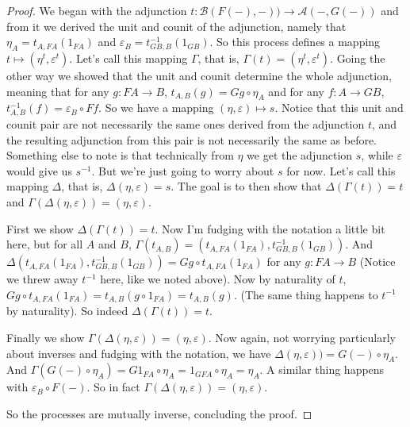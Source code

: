 \documentclass[11pt]{article}
\theoremstyle{definition}
\theoremstyle{definition}
\theoremstyle{plain}
\theoremstyle{plain}
\theoremstyle{plain}
\begin{document}
\begin{proof}
We began with the adjunction $t: \mathscr{B}(F(-),-)) \to \mathscr{A}(-, G(-))$ and from it we derived the unit and counit of the adjunction, namely that $\eta_A=t_{A,FA}(1_{FA})$ and $\varepsilon_B = t^{-1}_{GB, B}(1_{GB})$. So this process defines a mapping $t \mapsto (\eta^t, \varepsilon^t)$. Let's call this mapping $\Gamma$, that is, $\Gamma(t) = (\eta^t, \varepsilon^t)$. Going the other way we showed that the unit and counit determine the whole adjunction, meaning that for any $g: FA \to B$, $t_{A,B}(g) = Gg \circ \eta_A$ and for any $f: A \to GB$, $t^{-1}_{A,B}(f) = \varepsilon_B \circ Ff$. So we have a mapping $(\eta, \varepsilon) \mapsto s$. Notice that this unit and counit pair are not necessarily the same ones derived from the adjunction $t$, and the resulting adjunction from this pair is not necessarily the same as before. Something else to note is that technically from $\eta$ we get the adjunction $s$, while $\varepsilon$ would give us $s^{-1}$. But we're just going to worry about $s$ for now. Let's call this mapping $\Delta$, that is, $\Delta(\eta, \varepsilon) = s$. The goal is to then show that $\Delta(\Gamma(t)) = t$ and $\Gamma(\Delta(\eta, \varepsilon)) = (\eta, \varepsilon)$.

First we show $\Delta(\Gamma(t)) = t$. Now I'm fudging with the notation a little bit here, but for all $A$ and $B$, $\Gamma(t_{A,B}) = ({t_{A,FA}(1_{FA})}, t^{-1}_{GB,B}(1_{GB}))$. And $\Delta({t_{A,FA}(1_{FA})}, t^{-1}_{GB,B}(1_{GB}))=Gg \circ t_{A,FA}(1_{FA})$ for any $g: FA \to B$ (Notice we threw away $t^{-1}$ here, like we noted above). Now by naturality of $t$, $Gg \circ t_{A,FA}(1_{FA}) = t_{A,B}(g \circ 1_{FA}) = t_{A,B}(g)$. (The same thing happens to $t^{-1}$ by naturality). So indeed $\Delta(\Gamma(t)) = t$.

Finally we show $\Gamma(\Delta(\eta, \varepsilon)) = (\eta, \varepsilon)$. Now again, not worrying particularly about inverses and fudging with the notation, we have $\Delta(\eta, \varepsilon)) = G(-) \circ \eta_{A}$. And $\Gamma(G(-) \circ \eta_{A}) = G1_{FA} \circ \eta_A = 1_{GFA} \circ \eta_A = \eta_A$. A similar thing happens with $\varepsilon_B \circ F(-)$. So in fact $\Gamma(\Delta(\eta, \varepsilon)) = (\eta, \varepsilon)$.

So the processes are mutually inverse, concluding the proof.
\end{proof}
 \nocite{*}
 
 
\end{document}
